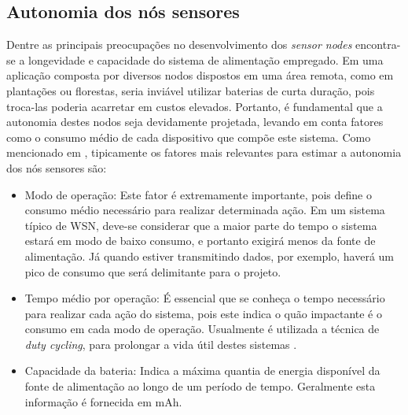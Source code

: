 \documentclass[oneside,openright,12pt]{ufsm_2015} %
\begin{document}
\subsection{Autonomia dos nós sensores}
Dentre as principais preocupações no desenvolvimento dos \textit{sensor nodes} encontra-se a longevidade e capacidade do sistema de alimentação empregado. Em uma aplicação composta por diversos nodos dispostos em uma área remota, como em plantações ou florestas, seria inviável utilizar baterias de curta duração, pois troca-las poderia acarretar em custos elevados. Portanto, é fundamental que a autonomia destes nodos seja devidamente projetada, levando em conta fatores como o consumo médio de cada dispositivo que compõe este sistema. Como mencionado em \cite{tan2013energy}, tipicamente os fatores mais relevantes para estimar a autonomia dos nós sensores são: 

\begin{itemize}
    \item Modo de operação: Este fator é extremamente importante, pois define o consumo médio necessário para realizar determinada ação. Em um sistema típico de WSN, deve-se considerar que a maior parte do tempo o sistema estará em modo de baixo consumo, e portanto exigirá menos da fonte de alimentação. Já quando estiver transmitindo dados, por exemplo, haverá um pico de consumo que será delimitante para o projeto.
    
    \item Tempo médio por operação: É essencial que se conheça o tempo necessário para realizar cada ação do sistema, pois este indica o quão impactante é o consumo em cada modo de operação. Usualmente é utilizada a técnica de \textit{duty cycling}, para prolongar a vida útil destes sistemas \cite{zhang2010energy}.
    
    \item Capacidade da bateria: Indica a máxima quantia de energia disponível da fonte de alimentação ao longo de um período de tempo. Geralmente esta informação é fornecida em mAh. 
\end{itemize}
\end{document}
